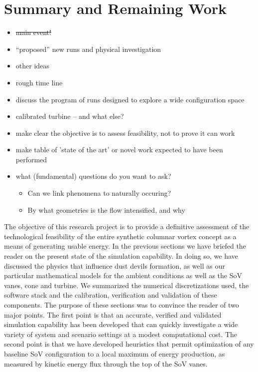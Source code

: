 \section{Summary and Remaining Work}
\label{sec:future_work}

\begin{itemize}
\item \st{main event!}
\item ``proposed'' new runs and physical investigation
\item other ideas
\item rough time line
\item discuss the program of runs designed to explore a wide configuration space
\item calibrated turbine -- and what else?
\item make clear the objective is to assess feasibility, not to prove it can work
\item make table of 'state of the art' or novel work expected to have been performed
\item what (fundamental) questions do you want to ask?
      \begin{itemize}
      \item Can we link phenomena to naturally occuring?
      \item By what geometries is the flow intensified, and why
      \end{itemize}
\end{itemize}

The objective of this research project is to provide a definitive assessment of the 
technological feasibility of the entire synthetic columnar vortex concept as a 
means of generating usable energy. In the 
previous sections we have briefed the reader on the present state of the
simulation capability. In doing so, we have discussed the physics that
influence dust devils formation, as well as our particular mathematical
models for the ambient conditions as well as the SoV vanes, cone and
turbine. We summarized the numerical discretizations used, the software
stack and the calibration, verification and validation of these
components. The purpose of these sections was to convince the reader of
two major points. The first point is that an accurate, verified and
validated simulation capability has been developed that can quickly
investigate a wide variety of system and scenario settings at a modest
computational cost. The second point is that we have developed
heuristics that permit optimization of any baseline SoV configuration to
a local maximum of energy production, as measured by kinetic energy flux
through the top of the SoV vanes.  

